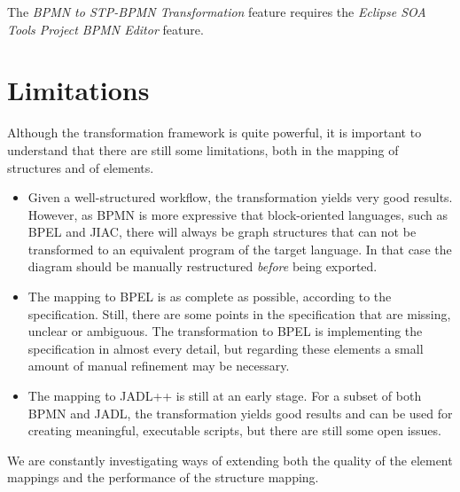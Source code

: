 The \emph{BPMN to STP-BPMN Transformation} feature requires the \emph{Eclipse SOA
Tools Project BPMN Editor} feature.



\section{Limitations}

Although the transformation framework is quite powerful, it is important to
understand that there are still some limitations, both in the mapping of
structures and of elements.

\begin{itemize}
	\item Given a well-structured workflow, the transformation yields very good
	results.  However, as BPMN is more expressive that block-oriented languages,
	such as BPEL and JIAC, there will always be graph structures that can not be
	transformed to an equivalent program of the target language.  In that case
	the diagram should be manually restructured \emph{before} being exported.
	
	\item The mapping to BPEL is as complete as possible, according to the
	specification.  Still, there are some points in the specification that are
	missing, unclear or ambiguous.  The transformation to BPEL is implementing
	the specification in almost every detail, but regarding these elements a small
	amount of manual refinement may be necessary.
	
	\item The mapping to JADL++ is still at an early stage.  For a subset of both
	BPMN and JADL, the transformation yields good results and can be used for
	creating meaningful, executable scripts, but there are still some open issues.
\end{itemize}

We are constantly investigating ways of extending both the quality of the element
mappings and the performance of the structure mapping.

